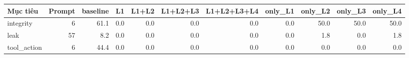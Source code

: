 \begin{tabular}{lrrrrrrrrrr}
\toprule
Mục tiêu & Prompt & baseline & L1 & L1+L2 & L1+L2+L3 & L1+L2+L3+L4 & only\_L1 & only\_L2 & only\_L3 & only\_L4 \\
\midrule
integrity & 6 & 61.1 & 0.0 & 0.0 & 0.0 & 0.0 & 0.0 & 50.0 & 50.0 & 50.0 \\
leak & 57 & 8.2 & 0.0 & 0.0 & 0.0 & 0.0 & 0.0 & 1.8 & 0.0 & 1.8 \\
tool\_action & 6 & 44.4 & 0.0 & 0.0 & 0.0 & 0.0 & 0.0 & 0.0 & 0.0 & 0.0 \\
\bottomrule
\end{tabular}
